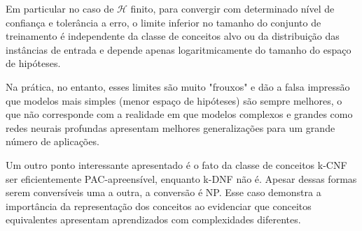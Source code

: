 \documentclass[
10pt, %
a4paper, %
onecolumn, %
]{article}
\begin{document}
Em particular no caso de $\mathcal{H}$ finito, para convergir com determinado nível de confiança e tolerância a erro, o limite inferior no tamanho do conjunto de treinamento é independente da classe de conceitos alvo ou da distribuição das instâncias de entrada e depende apenas logaritmicamente do tamanho do espaço de hipóteses. 

Na prática, no entanto, esses limites são muito "frouxos"\cite{MitchelPAC} e dão a falsa impressão que modelos mais simples (menor espaço de hipóteses) são sempre melhores, o que não corresponde com a realidade em que modelos complexos e grandes como redes neurais profundas apresentam melhores generalizações para um grande número de aplicações.

Um outro ponto interessante apresentado é o fato da classe de conceitos k-CNF ser eficientemente PAC-apreensível, enquanto k-DNF não é. Apesar dessas formas serem conversíveis uma a outra, a conversão é NP. Esse caso demonstra a importância da representação dos conceitos ao evidenciar que conceitos equivalentes apresentam aprendizados com complexidades diferentes. 


\renewcommand{\refname}{Referências} %


\end{document}
